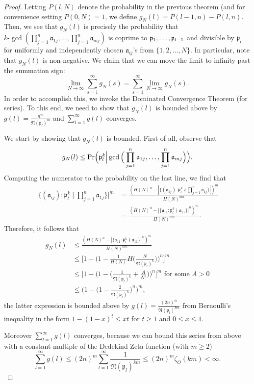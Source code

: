 \documentclass[12pt]{amsart}
\theoremstyle{definition}
\newcommand{\f}[1]{\mathfrak{#1}}
\begin{document}
\begin{proof}
Letting $P(l, N)$ denote the probability in the previous theorem (and for convenience setting $P(0, N) = 1$, we define $g_N(l) = P(l-1, n) - P(l, n)$. Then, we see that $g_N(l)$ is precisely the probability that $k\text{-}\gcd(\prod_{j=1}^n \f{a}_{1j}, ... , \prod_{j=1}^n \f{a}_{mj})$ is coprime to $\f{p}_1, \mathellipsis, \f{p}_{l-1}$ and divisible by $\f{p}_l$ for uniformly and independently chosen $\f{a}_{ij}$'s from $\{1, 2, ..., N\}$. In particular, note that $g_N(l)$ is non-negative. We claim that we can move the limit to infinity past the summation sign:
$$\lim_{N \to \infty} \sum_{s=1}^{\infty} g_N(s) = \sum_{s=1}^{\infty} \lim_{N \to \infty} g_N(s).$$
In order to accomplish this, we invoke the Dominated Convergence Theorem (for series). To this end, we need to show that $g_N(l)$ is bounded above by $g(l) = \frac{n^m}{\f{N}(\f{p}_{l})^{m}}$ and $\sum_{l=1}^{\infty} g(l)$ converges.

We start by showing that $g_N(l)$ is bounded. First of all, observe that
$$g_N(l) \leq \text{Pr}\Big(\f{p}_l^k \Big| \gcd\Big(\prod_{j=1}^n \f{a}_{1j}, \mathellipsis, \prod_{j=1}^n \f{a}_{mj}\Big)\Big).$$
Computing the numerator to the probability on the last line, we find that
\begin{align*} 
	\Big|\{(\f{a}_{ij}) : \f{p}_l^k \mid \prod_{j=1}^n \f{a}_{1j}\}\Big|^m &= \frac{(H(N)^n - |\{(\f{a}_{1j}) : \f{p}_l^k \nmid \prod_{j=1}^n \f{a}_{1j}\}|)^m}{H(N)^{mn}}\\
	&= \frac{(H(N)^n - |\{\f{a}_{11} : \f{p}_l^k \nmid \f{a}_{11}\}|^n)^m}{H(N)^{mn}}. \end{align*}
Therefore, it follows that
\begin{align*} 
	g_N(l) &\leq \frac{(H(N)^n - |\{\f{a}_{11} : \f{p}_l^k \nmid \f{a}_{11}\}|^n)^m}{H(N)^{mn}}\\
	&\leq \Big[1 - \Big(1 - \frac{1}{H(N)}  H\Big(\frac{N}{\f{N}(\f{p}_l)^k}\Big)\Big)^n\Big]^m\\
	&\leq \Big[1 - \Big(1 - \Big(\frac{1}{\f{N}(\f{p}_l)^k}+\frac{A}{N^{\varepsilon}}\Big)\Big)^n\Big]^m \text{ for some } A>0\\
	&\leq \Big(1 - \Big(1 - \frac{2}{\f{N}(\f{p}_l)^k}\Big)^n \Big)^m,
\end{align*}
the latter expression is bounded above by $g(l)=\frac{(2n)^m}{\f{N}(\f{p}_l)^{km}}$ from Bernoulli's inequality in the form $1-(1-x)^t\leq xt$ for $t\geq 1$ and $0\leq x \leq 1$.

 Moreover $\sum_{l=1}^{\infty} g(l)$ converges, because we can bound this series from above with a constant multiple of the Dedekind Zeta function (with $m\geq 2$) $$ \sum_{l=1}^{\infty}g(l)\leq(2n)^m\sum_{l=1}^{\infty}\frac{1}{\f{N}(\f{p}_l)^{km}}\leq (2n)^m\zeta_O(km)< \infty.$$


\end{proof}
\end{document}

